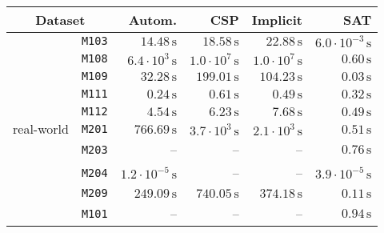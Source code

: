 \begin{tabular}{cc|rrrr}
\multicolumn{2}{c|}{                 Dataset} &                        Autom. &                           CSP &                      Implicit &                           SAT\\
\hline
\multirow{20}{*}{\begin{turn}{90}real-world\end{turn}}
 & \texttt{\footnotesize                 M103} & $            14.48\,\text{s}$ & $            18.58\,\text{s}$ & $            22.88\,\text{s}$ & $ 6.0\cdot 10^{-3}\,\text{s}$\\
 & \texttt{\footnotesize                 M108} & $  6.4\cdot 10^{3}\,\text{s}$ & $  1.0\cdot 10^{7}\,\text{s}$ & $  1.0\cdot 10^{7}\,\text{s}$ & $             0.60\,\text{s}$\\
 & \texttt{\footnotesize                 M109} & $            32.28\,\text{s}$ & $           199.01\,\text{s}$ & $           104.23\,\text{s}$ & $             0.03\,\text{s}$\\
 & \texttt{\footnotesize                 M111} & $             0.24\,\text{s}$ & $             0.61\,\text{s}$ & $             0.49\,\text{s}$ & $             0.32\,\text{s}$\\
 & \texttt{\footnotesize                 M112} & $             4.54\,\text{s}$ & $             6.23\,\text{s}$ & $             7.68\,\text{s}$ & $             0.49\,\text{s}$\\
 & \texttt{\footnotesize                 M201} & $           766.69\,\text{s}$ & $  3.7\cdot 10^{3}\,\text{s}$ & $  2.1\cdot 10^{3}\,\text{s}$ & $             0.51\,\text{s}$\\
 & \texttt{\footnotesize                 M203} &                              -- &                              -- &                              -- & $             0.76\,\text{s}$\\
 & \texttt{\footnotesize                 M204} & $ 1.2\cdot 10^{-5}\,\text{s}$ &                              -- &                              -- & $ 3.9\cdot 10^{-5}\,\text{s}$\\
 & \texttt{\footnotesize                 M209} & $           249.09\,\text{s}$ & $           740.05\,\text{s}$ & $           374.18\,\text{s}$ & $             0.11\,\text{s}$\\
 & \texttt{\footnotesize                 M101} &                              -- &                              -- &                              -- & $             0.94\,\text{s}$\\

\end{tabular}
